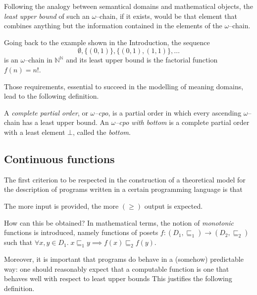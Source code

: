 Following the analogy between semantical domains and mathematical objects, the \emph{least upper bound} of such an \(\omega\)--chain, if it exists, would be that element that combines anything but the information contained in the elements of the \(\omega\)--chain. %

Going back to the example shown in the Introduction, the sequence
\begin{equation*}
  \emptyset, \lbrace (0,1) \rbrace, \lbrace (0,1), (1,1) \rbrace, \dotsc
\end{equation*}
is an \(\omega\)--chain in \(\mathbb{N}^\mathbb{N}\) and its least upper bound is the factorial function \(f(n) = n!\). %

Those requirements, essential to succeed in the modelling of meaning domains, lead to the following definition.

\begin{dfn}
  A \emph{complete partial order}, or \emph{\(\omega\)--cpo}, is a partial order in which every ascending \(\omega\)--chain has a least upper bound. %
  An \emph{\(\omega\)--cpo with bottom} is a complete partial order with a least element %
  \(\bot\), called the \emph{bottom}. %
\end{dfn}

\subsection[Continuous functions]{Continuous functions}

The first criterion to be respected in the construction of a theoretical model for the description of programs written in a certain programming language is that
\begin{center}
  The more input is provided, the more \((\ge)\) output is expected.
\end{center}
How can this be obtained? In mathematical terms, the notion of \emph{monotonic} functions is introduced, namely functions of posets%
\(f \colon (D_1,{}\sqsubseteq_1) \to (D_2,{}\sqsubseteq_2)\) such that
\(
  \forall{}x,y \in D_1.\; x \sqsubseteq_1 y \implies f(x) \sqsubseteq_2 f(y).
\)

Moreover, it is important that programs do behave in a (somehow) predictable way: one should reasonably expect that a computable function is one that behaves well with respect to least upper bounds
This justifies the following definition.

